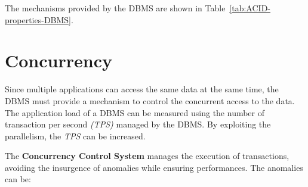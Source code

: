 \documentclass[english]{article}
\begin{document}
The mechanisms provided by the DBMS are shown in Table~\ref{tab:ACID-properties-DBMS}.

\begin{table}[htbp]
  \bigskip
  \centering
  \bigskip
  \caption{ACID properties and the DBMS mechanisms}
  \label{tab:ACID-properties-DBMS}
\end{table}

\clearpage

\section{Concurrency}

Since multiple applications can access the same data at the same time, the DBMS must provide a mechanism to control the concurrent access to the data.
The application load of a DBMS can be measured using the number of transaction per second \textit{(TPS)} managed by the DBMS.
By exploiting the parallelism, the \textit{TPS} can be increased.

The \textbf{Concurrency Control System} manages the execution of transactions, avoiding the insurgence of anomalies while ensuring performances.
The anomalies can be:
\end{document}
